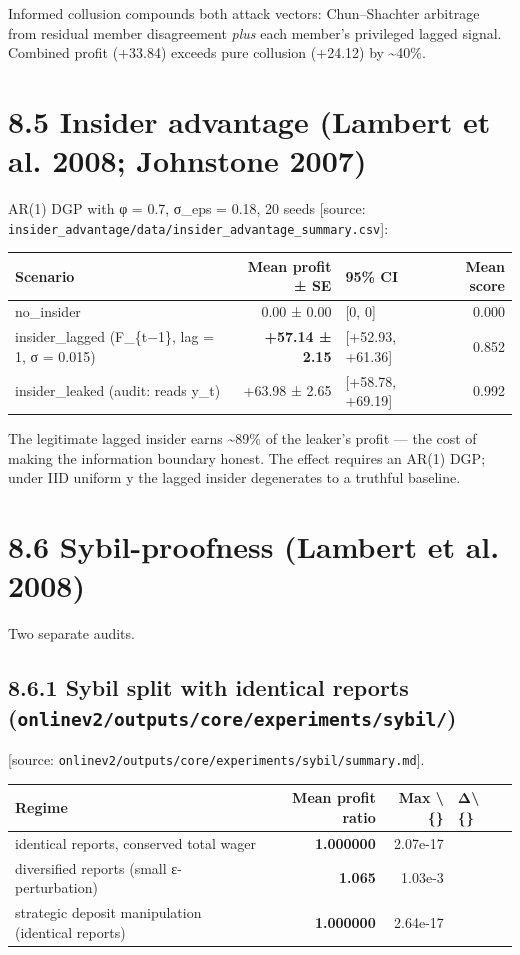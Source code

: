 \documentclass[11pt,a4paper,openany]{report}
\begin{document}
Informed collusion compounds both attack vectors: Chun–Shachter
arbitrage from residual member disagreement \emph{plus} each member's
privileged lagged signal. Combined profit (+33.84) exceeds pure
collusion (+24.12) by \textasciitilde{}40\%.

\section{8.5 Insider advantage (Lambert et al. 2008; Johnstone 2007)}

AR(1) DGP with φ = 0.7, σ\_eps = 0.18, 20 seeds [source:
\texttt{insider\_advantage/data/insider\_advantage\_summary.csv}]:

\begin{center}
\small
\begin{tabular}{lrlr}
\toprule
\textbf{Scenario} & \textbf{Mean profit ± SE} & \textbf{95\% CI} & \textbf{Mean score} \\
\midrule
no\_insider & 0.00 ± 0.00 & [0, 0] & 0.000 \\
insider\_lagged (F\_\{t−1\}, lag = 1, σ = 0.015) & \textbf{+57.14 ± 2.15} & [+52.93, +61.36] & 0.852 \\
insider\_leaked (audit: reads y\_t) & +63.98 ± 2.65 & [+58.78, +69.19] & 0.992 \\
\bottomrule
\end{tabular}
\end{center}

The legitimate lagged insider earns \textasciitilde{}89\% of the leaker's profit — the
cost of making the information boundary honest. The effect requires an
AR(1) DGP; under IID uniform y the lagged insider degenerates to a
truthful baseline.

\section{8.6 Sybil-proofness (Lambert et al. 2008)}

Two separate audits.

\subsection{8.6.1 Sybil split with identical reports (\texttt{onlinev2/outputs/core/experiments/sybil/})}

[source: \texttt{onlinev2/outputs/core/experiments/sybil/summary.md}].

\begin{center}
\small
\begin{tabular}{lrrll}
\toprule
\textbf{Regime} & \textbf{Mean profit ratio} & \textbf{Max \textbackslash\{\}} & \textbf{Δ\textbackslash\{\}} & \textbf{} \\
\midrule
identical reports, conserved total wager & \textbf{1.000000} & 2.07e-17 &  &  \\
diversified reports (small ε-perturbation) & \textbf{1.065} & 1.03e-3 &  &  \\
strategic deposit manipulation (identical reports) & \textbf{1.000000} & 2.64e-17 &  &  \\
\bottomrule
\end{tabular}
\end{center}
\end{document}
